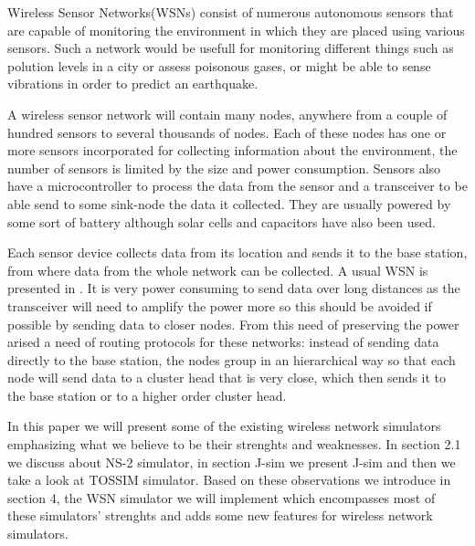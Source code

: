 
Wireless Sensor Networks(WSNs) consist of numerous autonomous sensors that are
capable of monitoring the environment in which they are placed using various
sensors. Such a network would be usefull for monitoring different things such
as polution levels
in a city or assess poisonous gases, or might be able to sense vibrations in order 
to predict an earthquake. 

A wireless sensor network will contain many nodes, anywhere from a couple of
hundred sensors to several thousands of nodes. Each of these nodes has one or
more sensors incorporated for collecting information about the environment, the number of
sensors is limited
by the size and power consumption. Sensors also have a microcontroller 
to process the data from the sensor and a transceiver to be able send to some 
sink-node the data it collected. They are usually powered by some sort of battery 
although solar cells and capacitors have also been used.

Each sensor device collects data from its location and sends it to the base station,
from where data from the whole network can be collected. A usual WSN is
presented in . It is very power
consuming to send data over long distances as the transceiver will need to
amplify the power more so this should be avoided if possible by sending data to
closer nodes. From this need of preserving the power 
arised a need of routing protocols for these
networks: instead of sending data directly to the base station, the nodes
group in an hierarchical way so that each node will send data to a cluster
head that is very close, which then sends it to the base station or to a higher
order cluster head.


In this paper we will present some of the existing wireless network
simulators emphasizing what we believe to be their strenghts and weaknesses. 
In section 2.1 we discuss about NS-2 simulator, in section J-sim we present
J-sim and then we take a look at TOSSIM simulator. Based on these observations
we introduce in section 4, the WSN simulator we will implement which
encompasses most of these simulators' strenghts and adds some new features
for wireless network simulators.
